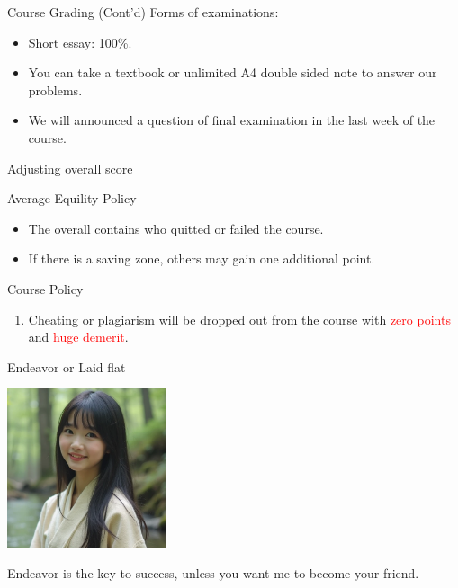 \documentclass{beamer}
\begin{document}
\begin{frame}{Course Grading (Cont'd)}
Forms of examinations:
\begin{itemize}
\item Short essay: 100\%.
\item You can take a textbook or unlimited A4 double sided note to answer our problems.
\item We will announced a question of final examination in the last week of the course.
\end{itemize}
\end{frame}
\begin{frame}{Adjusting overall score}
\begin{block}{Average Equility Policy}
\begin{itemize}
\item The overall contains who quitted or failed the course.
\item If there is a saving zone, others may gain one additional point.
\end{itemize}
\end{block}
\end{frame}
\begin{frame}{Course Policy}
\begin{enumerate}
\item Cheating or plagiarism will be dropped out from the course with \textcolor{red}{zero points} and \textcolor{red}{huge demerit}. \\
\end{enumerate}
\end{frame}
\begin{frame}{Endeavor or Laid flat}
\begin{center}
\includegraphics[width=0.35\textwidth]{fail.png}
\end{center}
\begin{center}
Endeavor is the key to success, unless you want me to become your friend.
\end{center}
\end{frame}
\end{document}
